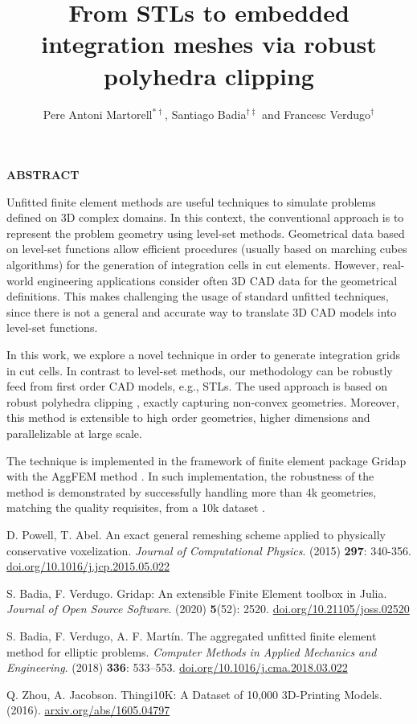 \documentclass{coupled2019_abstract}
\title{From STLs to embedded integration meshes via robust polyhedra clipping}
\author{Pere Antoni Martorell$^{*\dag}$, Santiago Badia$^{\dag\ddag}$ and Francesc Verdugo$^{\dag}$ }
\begin{document}
\begin{center}
\bf ABSTRACT
\end{center}

Unfitted finite element methods are useful techniques to simulate problems defined on 3D complex domains. 
In this context, the conventional approach is to represent the problem geometry using level-set methods. 
Geometrical data based on level-set functions allow efficient procedures (usually based on marching cubes algorithms) for the generation of integration cells in cut elements. 
However, real-world engineering applications consider often 3D CAD data for the geometrical definitions. 
This makes challenging the usage of standard unfitted techniques, since there is not a general and accurate way to translate 3D CAD models into level-set functions.

In this work, we explore a novel technique in order to generate integration grids in cut cells.
In contrast to level-set methods, our methodology can be robustly feed from first order CAD models, e.g., STLs.
The used approach is based on robust polyhedra clipping \cite{Powel}, exactly capturing non-convex geometries.
Moreover, this method is extensible to high order geometries, higher dimensions and parallelizable at large scale.

The technique is implemented in the framework of finite element package Gridap \cite{Gridap} with the AggFEM method \cite{AgFEM}. In such implementation, the robustness of the method is demonstrated by successfully handling more than 4k geometries, matching the quality requisites, from a 10k dataset \cite{10k}.


\begin{thebibliography}{99}

D. Powell, T. Abel. 
An exact general remeshing scheme applied to physically conservative voxelization.
\textit{Journal of Computational Physics}.
(2015) \textbf{297}: 340-356. 
\url{doi.org/10.1016/j.jcp.2015.05.022}

S. Badia, F. Verdugo.
Gridap: An extensible Finite Element toolbox in Julia.
\textit{Journal of Open Source Software}. 
(2020) \textbf{5}(52): 2520.
\url{doi.org/10.21105/joss.02520}

S. Badia, F. Verdugo, A. F. Mart\'in.
The aggregated unfitted finite element method for elliptic problems.
\textit{Computer Methods in Applied Mechanics and Engineering}. 
(2018) \textbf{336}: 533--553. 
\url{doi.org/10.1016/j.cma.2018.03.022}

Q. Zhou, A. Jacobson. 
Thingi10K: A Dataset of 10,000 3D-Printing Models.
(2016).
\url{arxiv.org/abs/1605.04797}

\end{thebibliography}
\end{document}
